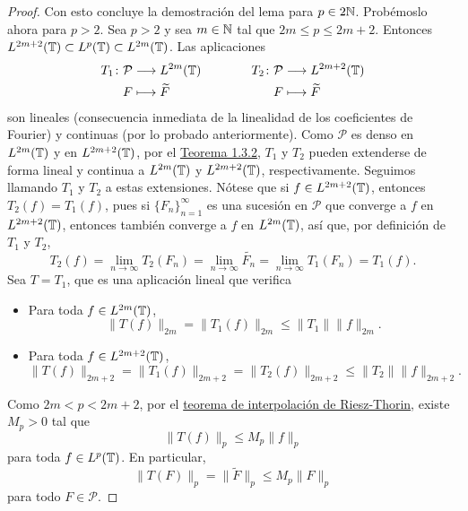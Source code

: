 \documentclass[a4paper, 12pt, oneside]{book}
\begin{document}
\begin{proof}
    Con esto concluye la demostración del lema para $p \in 2\mathbb N$. Probémoslo ahora para $p > 2$. Sea $p>2$ y sea $m\in\mathbb N$ tal que $2m\leq p \leq 2m+2$. Entonces $L^{2m+2}(\mathbb T) \subset L^p(\mathbb T) \subset L^{2m}(\mathbb T)$. Las aplicaciones
    \[
    \begin{aligned}[t]
        T_{1} \colon \mathcal{P} &\longrightarrow L^{2m}(\mathbb T) \\
        F &\longmapsto \widetilde{F} 
    \end{aligned}
    \qquad \qquad
    \begin{aligned}[t]
        T_{2} \colon \mathcal{P} &\longrightarrow L^{2m+2}(\mathbb T) \\
        F &\longmapsto \widetilde{F} 
    \end{aligned}
    \]
    son lineales (consecuencia inmediata de la linealidad de los coeficientes de Fourier) y continuas (por lo probado anteriormente). Como $\mathcal{P}$ es denso en $L^{2m}(\mathbb T)$ y en $L^{2m+2}(\mathbb T)$, por el \hyperref[1.3.2]{\color{blue}Teorema 1.3.2}, $T_{1}$ y $T_{2}$ pueden extenderse de forma lineal y continua a $L^{2m}(\mathbb T)$ y $L^{2m+2}(\mathbb T)$, respectivamente. Seguimos llamando $T_{1}$ y $T_{2}$ a estas extensiones. Nótese que si $f \in L^{2m+2}(\mathbb T)$, entonces $T_2(f) = T_1(f)$, pues si $\{F_n\}_{n=1}^\infty$ es una sucesión en $\mathcal{P}$ que converge a $f$ en $L^{2m+2}(\mathbb T)$, entonces también converge a $f$ en $L^{2m}(\mathbb T)$, así que, por definición de $T_1$ y $T_2$,
    \[T_2(f)=\lim_{n\to\infty} T_2(F_n) = \lim_{n\to\infty} \widetilde{F_n} =  \lim_{n\to\infty} T_1(F_n) = T_1(f).\] 
    Sea $T = T_{1}$, que es una aplicación lineal que verifica
    \begin{itemize}
        \item Para toda $f \in L^{2m}(\mathbb T)$, \[\|T(f)\|_{2m} = \|T_{1}(f)\|_{2m} \leq \|T_{1}\| \|f\|_{2m}.\]
        \item Para toda $f \in L^{2m+2}(\mathbb T)$, \[\|T(f)\|_{2m+2} = \|T_1(f)\|_{2m+2} = \|T_2(f)\|_{2m+2} \leq \|T_2\|\|f\|_{2m+2}.\]
    \end{itemize}
    Como $2m<p<2m+2$, por el \hyperref[3.2.5]{\color{blue}teorema de interpolación de Riesz-Thorin}, existe $M_p>0$ tal que
    \[\|T(f)\|_p  \leq M_p\|f\|_p\]
    para toda $f \in L^p(\mathbb T)$. En particular,
    \[\|T(F)\|_{p} = \|\widetilde{F}\|_{p} \leq M_p \|F\|_p\]
    para todo $F \in \mathcal{P}$. 
    

\end{proof}
\end{document}
